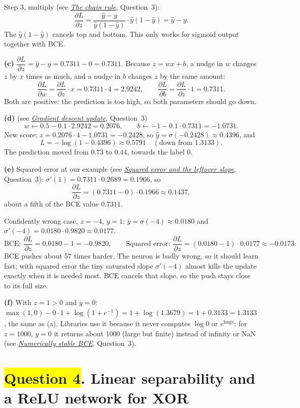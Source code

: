 \documentclass[12pt,a4paper]{article}
\newcommand{\seeconcept}[3]{(see \hyperref[#1]{\textit{#2}}, Question~#3)}
\newcommand{\hlq}[1]{{\setlength{\fboxsep}{1.5pt}\colorbox{yellow}{#1}}}
\begin{document}
Step 3, multiply \seeconcept{c:chain}{The chain rule}{3}:
\[
\frac{\partial L}{\partial z}=\frac{\hat y-y}{\hat y(1-\hat y)}\cdot\hat y(1-\hat y)=\hat y-y .
\]
The $\hat y(1-\hat y)$ cancels top and bottom. This only works for sigmoid output together with BCE.

\textbf{(c)} $\dfrac{\partial L}{\partial z}=\hat y-y=0.7311-0=0.7311$. Because $z=wx+b$, a nudge in $w$ changes $z$ by $x$ times as much, and a nudge in $b$ changes $z$ by the same amount:
\[
\frac{\partial L}{\partial w}=\frac{\partial L}{\partial z}\cdot x=0.7311\cdot4=2.9242,\qquad
\frac{\partial L}{\partial b}=\frac{\partial L}{\partial z}\cdot1=0.7311 .
\]
Both are positive: the prediction is too high, so both parameters should go down.

\textbf{(d)} \seeconcept{c:gd}{Gradient descent update}{3}
\[
w\leftarrow0.5-0.1\cdot2.9242=0.2076,\qquad b\leftarrow-1-0.1\cdot0.7311=-1.0731 .
\]
New score: $z=0.2076\cdot4-1.0731=-0.2428$, so $\hat y=\sigma(-0.2428)\approx0.4396$, and
\[
L=-\log(1-0.4396)\approx0.5791 \quad(\text{down from }1.3133).
\]
The prediction moved from $0.73$ to $0.44$, towards the label 0.

\textbf{(e)} Squared error at our example \seeconcept{c:sqerr}{Squared error and the leftover slope}{3}: $\sigma'(1)=0.7311\cdot0.2689=0.1966$, so
\[
\frac{\partial L}{\partial z}=(0.7311-0)\cdot0.1966\approx0.1437,
\]
about a fifth of the BCE value $0.7311$.

Confidently wrong case, $z=-4$, $y=1$: $\hat y=\sigma(-4)\approx0.0180$ and $\sigma'(-4)=0.0180\cdot0.9820\approx0.0177$.
\[
\text{BCE: }\frac{\partial L}{\partial z}=0.0180-1=-0.9820,\qquad
\text{Squared error: }\frac{\partial L}{\partial z}=(0.0180-1)\cdot0.0177\approx-0.0173 .
\]
BCE pushes about 57 times harder. The neuron is badly wrong, so it should learn fast; with squared error the tiny saturated slope $\sigma'(-4)$ almost kills the update exactly when it is needed most. BCE cancels that slope, so the push stays close to its full size.

\textbf{(f)} With $z=1>0$ and $y=0$: $\max(1,0)-0\cdot1+\log(1+e^{-1})=1+\log(1.3679)=1+0.3133=1.3133$, the same as (a). Libraries use it because it never computes $\log 0$ or $e^{\text{huge}}$: for $z=1000$, $y=0$ it returns about 1000 (large but finite) instead of infinity or NaN \seeconcept{c:stablebce}{Numerically stable BCE}{3}.
\section[Question 4. Linear separability and a ReLU network for XOR]{\hlq{Question 4}. Linear separability and a ReLU network for XOR}
\end{document}
